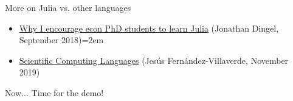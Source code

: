 \documentclass[handout]{beamer}
\begin{document}
\begin{frame}{More on Julia vs. other languages}
\begin{itemize}
    \item \href{https://tradediversion.net/2018/09/17/why-i-encourage-econ-phd-students-to-learn-julia/}{Why I encourage econ PhD students to learn Julia} (Jonathan Dingel, September 2018)\itemsep=2em
    \item \href{https://www.sas.upenn.edu/~jesusfv/Lecture_HPC_5_Scientific_Computing_Languages.pdf}{Scientific Computing Languages} (Jesús Fernández-Villaverde, November 2019)
\end{itemize}
\end{frame}

\begin{frame}{Now...}
Time for the demo!
\end{frame}
\end{document}
